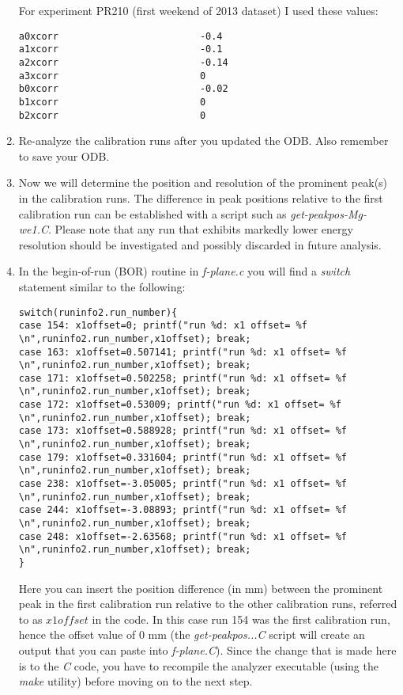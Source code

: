 \documentclass[11pt]{report}
\begin{document}
\begin{enumerate}
For experiment PR210 (first weekend of 2013 dataset) I used these values:
\begin{verbatim}
a0xcorr                         -0.4
a1xcorr                         -0.1
a2xcorr                         -0.14
a3xcorr                         0
b0xcorr                         -0.02
b1xcorr                         0
b2xcorr                         0
\end{verbatim}

\bigskip

\item 
Re-analyze the calibration runs after you updated the ODB. 
Also remember to save your ODB.

\item Now we will determine the position and resolution of the prominent peak(s) in the calibration runs.
The difference in peak positions relative to the first calibration run can be established with 
a script such as {\it get-peakpos-Mg-we1.C}.
Please note that any run that exhibits markedly lower energy resolution should be investigated 
and possibly discarded in future analysis.

\item In the begin-of-run (BOR) routine in {\it f-plane.c} you will find a {\it switch} statement similar 
to the following:
\begin{verbatim} 
switch(runinfo2.run_number){
case 154: x1offset=0; printf("run %d: x1 offset= %f \n",runinfo2.run_number,x1offset); break;   
case 163: x1offset=0.507141; printf("run %d: x1 offset= %f \n",runinfo2.run_number,x1offset); break;   
case 171: x1offset=0.502258; printf("run %d: x1 offset= %f \n",runinfo2.run_number,x1offset); break;   
case 172: x1offset=0.53009; printf("run %d: x1 offset= %f \n",runinfo2.run_number,x1offset); break;   
case 173: x1offset=0.588928; printf("run %d: x1 offset= %f \n",runinfo2.run_number,x1offset); break;   
case 179: x1offset=0.331604; printf("run %d: x1 offset= %f \n",runinfo2.run_number,x1offset); break;   
case 238: x1offset=-3.05005; printf("run %d: x1 offset= %f \n",runinfo2.run_number,x1offset); break;   
case 244: x1offset=-3.08893; printf("run %d: x1 offset= %f \n",runinfo2.run_number,x1offset); break;   
case 248: x1offset=-2.63568; printf("run %d: x1 offset= %f \n",runinfo2.run_number,x1offset); break;  
}
\end{verbatim}
Here you can insert the position difference (in mm) between the prominent peak in the first calibration
run relative to the other calibration runs, referred to as $x1offset$ in the code. 
In this case run 154 was the first calibration run,
hence the offset value of 0 mm  (the {\it get-peakpos...C} script will create an output that
you can paste into {\it f-plane.C}).
Since the change that is made here is to the {\it C} code, you have to recompile the analyzer executable
(using the {\it make} utility)
before moving on to the next step.


\end{enumerate}
\end{document}
